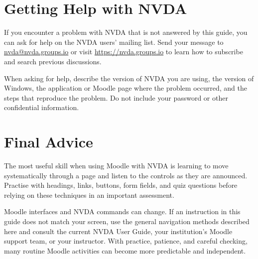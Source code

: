 \documentclass[11pt,oneside]{book}
\begin{document}
\appendix
\chapter{Getting Help with NVDA}
If you encounter a problem with NVDA that is not answered by this guide, you can ask for help on the NVDA users' mailing list. Send your message to \href{mailto:nvda@nvda.groups.io}{nvda@nvda.groups.io} or visit \url{https://nvda.groups.io} to learn how to subscribe and search previous discussions.

When asking for help, describe the version of NVDA you are using, the version of Windows, the application or Moodle page where the problem occurred, and the steps that reproduce the problem. Do not include your password or other confidential information.

\backmatter
\chapter*{Final Advice}
The most useful skill when using Moodle with NVDA is learning to move systematically through a page and listen to the controls as they are announced. Practise with headings, links, buttons, form fields, and quiz questions before relying on these techniques in an important assessment.

Moodle interfaces and NVDA commands can change. If an instruction in this guide does not match your screen, use the general navigation methods described here and consult the current NVDA User Guide, your institution's Moodle support team, or your instructor. With practice, patience, and careful checking, many routine Moodle activities can become more predictable and independent.
\end{document}
